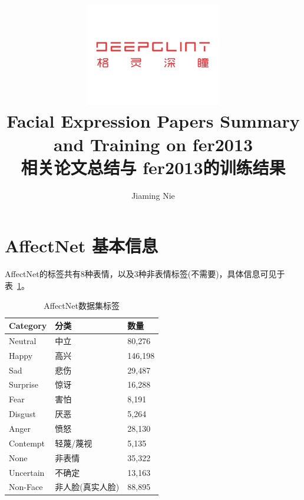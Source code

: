 \documentclass[11pt, a4paper]{article}
\title{\includegraphics[width=0.45\textwidth]{dg}
        \\Facial Expression Papers Summary and Training on fer2013 \\ 相关论文总结与 fer2013的训练结果 }          %
\author{Jiaming Nie}                    %
\begin{document}
\begin{titlepage}
	
\maketitle
{} %




\thispagestyle{empty}  %

\end{titlepage}









\section{AffectNet 基本信息}

AffectNet的标签共有8种表情，以及3种非表情标签(不需要)，具体信息可见于表~\ref{tab:an_label}。
\begin{table}[htbp] 
	\begin{center}
		\caption{AffectNet数据集标签}
		\begin{tabular}{|l|l|l|}  \hline
		Category & 分类 & 数量 \\ \hline
		Neutral & 中立 & 80,276 \\ \hline
		Happy & 高兴 & 146,198 \\ \hline
		Sad & 悲伤 &  29,487 \\ \hline
		Surprise & 惊讶 & 16,288 \\ \hline
		Fear & 害怕 & 8,191 \\ \hline
		Disgust & 厌恶 & 5,264 \\ \hline
		Anger & 愤怒 & 28,130 \\ \hline
		Contempt & 轻蔑/蔑视 & 5,135 \\ \hline
		None &    非表情    & 35,322 \\ \hline
		Uncertain &  不确定 & 13,163 \\ \hline
		Non-Face &  非人脸(真实人脸)  &  88,895 \\ \hline
		\end{tabular}
		
		\label{tab:an_label}
	\end{center}
\end{table}	
\end{document}
